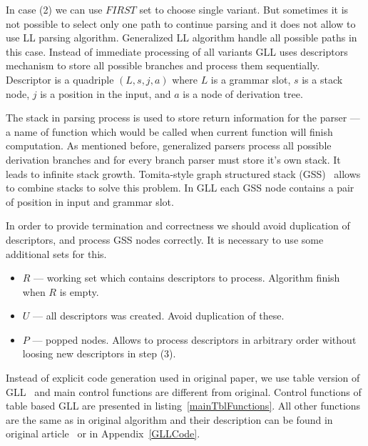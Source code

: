 In case (2) we can use $FIRST$ set to choose single variant. 
But sometimes it is not possible to select only one path to continue parsing and it does not allow to use LL parsing algorithm.
Generalized LL algorithm handle all possible paths in this case. 
Instead of immediate processing of all variants GLL uses descriptors mechanism to store all possible branches and process them sequentially. 
Descriptor is a quadriple $(L, s, j, a)$ where $L$ is a grammar slot, $s$ is a stack node, $j$ is a position in the input, and $a$ is a node of derivation tree. 

The stack in parsing process is used to store return information for the parser --- a name of function which would be called when current function will finish computation. 
As mentioned before, generalized parsers process all possible derivation branches and for every branch parser must store it's own stack. It leads to infinite stack growth.  
Tomita-style graph structured stack (GSS)~\cite{Tomita} allows to combine stacks to solve this problem.
In GLL each GSS node contains a pair of position in input and grammar slot. 

In order to provide termination and correctness we should avoid duplication of descriptors, and process GSS nodes correctly. It is necessary to use some additional sets for this.
\begin{itemize}
\item $R$ --- working set which contains descriptors to process. Algorithm finish when $R$ is empty.
\item $U$ --- all descriptors was created. Avoid duplication of these.
\item $P$ --- popped nodes. Allows to process descriptors in arbitrary order without loosing new descriptors in step (3). 
\end{itemize}

Instead of explicit code generation used in original paper, we use table version of GLL~\cite{TableGLL} and main control functions are different from original.
Control functions of table based GLL are presented in listing~\ref{mainTblFunctions}. All other functions are the same as in original algorithm and their description can be found in original article~\cite{scott2010gll} or in Appendix~\ref{GLLCode}.

